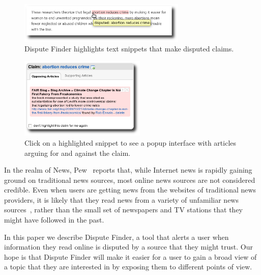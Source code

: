 \documentclass{www2010-submission}
\newcommand{\todo}[1]{}
\begin{document}
\begin{figure}[tb]
	\begin{center}
	\includegraphics[width=8cm]{pictures/highlight_abortion.png}
	\caption{Dispute Finder highlights text snippets that make disputed claims.}
	\label{highlight}
	\end{center}
\end{figure}

\begin{figure}[tb]
	\begin{center}
	\includegraphics[width=6cm]{pictures/popup_abortion_shadow.png}
	\caption{Click on a highlighted snippet to see a popup interface with articles arguing for and against the claim.}
	\label{claimview}
	\end{center}
\end{figure}
\todo{Popup interface should contain a ``don't mark this'' button}

\todo{More screenshots/graphs/visual information}

In the realm of News, Pew~\cite{pew-news} reports that, while Internet news is rapidly gaining ground on traditional news sources, most online news sources are not considered credible. Even when users are getting news from the websites of traditional news providers, it is likely that they read news from a variety of unfamiliar news sources~\cite{pew-news}, rather than the small set of newspapers and TV stations that they might have followed in the past.

\todo{word this better}\todo{update all screenshots}

In this paper we describe Dispute Finder, a tool that alerts a user when information they read online is disputed by a source that they might trust. Our hope is that Dispute Finder will make it easier for a user to gain a broad view of a topic that they are interested in by exposing them to different points of view.
\end{document}
